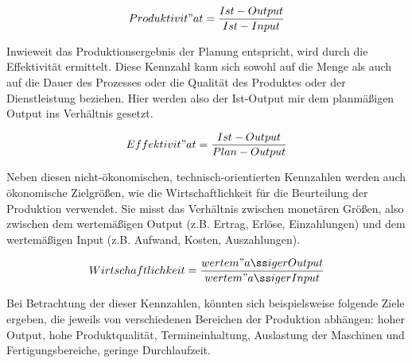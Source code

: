 \documentclass[a4paper,12pt, german]{report}
\begin{document}
\begin{equation}
  Produktivit"at =\frac{Ist-Output}{Ist-Input}
\end{equation}

Inwieweit das Produktionsergebnis der Planung entspricht, wird durch die Effektivität ermittelt. Diese Kennzahl kann sich sowohl auf die Menge als auch auf die Dauer des Prozesses oder die Qualität des Produktes oder der Dienstleistung beziehen. Hier werden also der Ist-Output mir dem planmäßigen Output ins Verhältnis gesetzt.\cite{20}

\begin{equation}
 Effektivit"at =\frac{Ist-Output}{Plan-Output}
\end{equation}


Neben diesen nicht-ökonomischen, technisch-orientierten Kennzahlen werden auch ökonomische Zielgrößen, wie die Wirtschaftlichkeit für die Beurteilung der Produktion verwendet. Sie misst das Verhältnis zwischen monetären Größen, also zwischen dem wertemäßigen Output (z.B. Ertrag, Erlöse, Einzahlungen) und dem wertemäßigen Input (z.B. Aufwand, Kosten, Auszahlungen).\cite{7}

\begin{equation}
  Wirtschaftlichkeit =\frac{wertem"aßiger Output}{wertem"aßiger Input}
\end{equation}

Bei Betrachtung der dieser Kennzahlen, könnten sich beispielsweise folgende Ziele ergeben, die jeweils von verschiedenen Bereichen der Produktion abhängen: hoher Output, hohe Produktqualität, Termineinhaltung, Auslastung der Maschinen und Fertigungsbereiche, geringe Durchlaufzeit. 
\end{document}
